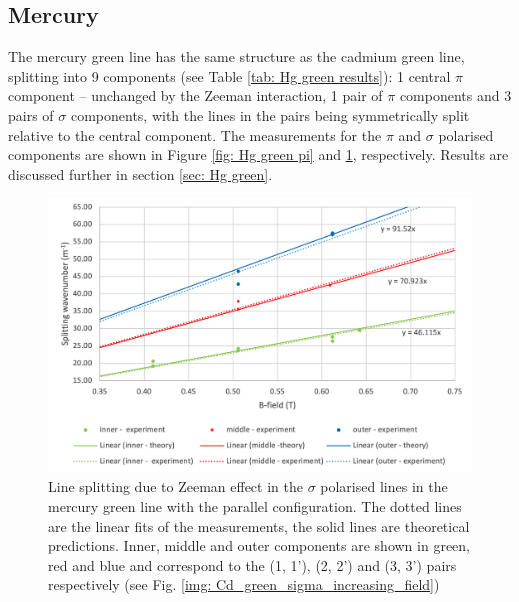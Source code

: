 \documentclass[11pt]{article}
\begin{document}
\newpage

\subsection{Mercury}
The mercury green line has the same structure as the cadmium green line, splitting into 9 components (see Table \ref{tab: Hg green results}): 1 central $\pi$ component -- unchanged by the Zeeman interaction, 1 pair of $\pi$ components and 3 pairs of $\sigma$ components, with the lines in the pairs being symmetrically split relative to the central component. The measurements for the $\pi$ and $\sigma$ polarised components are shown in Figure \ref{fig: Hg green pi} and \ref{fig: Hg green sigma}, respectively. Results are discussed further in section \ref{sec: Hg green}.
\begin{figure}[h!]
    \centering
    \includegraphics[width=0.9\linewidth]{Hg green sigma par graph.png}
    \captionsetup{width=\linewidth}
    \captionsetup{justification=centering}
    \caption{Line splitting due to Zeeman effect in the $\sigma$ polarised lines in the mercury green line with the parallel configuration. The dotted lines are the linear fits of the measurements, the solid lines are theoretical predictions. Inner, middle and outer components are shown in green, red and blue and correspond to the (1, 1'), (2, 2') and (3, 3') pairs respectively (see Fig. \ref{img: Cd_green_sigma_increasing_field})}
    \label{fig: Hg green sigma}
\end{figure}
\end{document}
